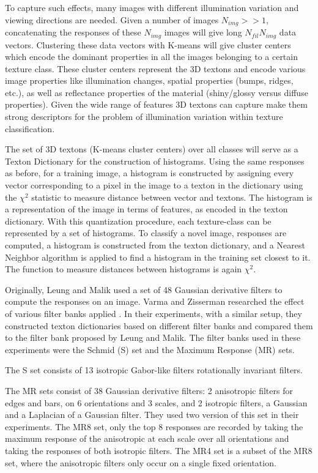 To capture such effects, many images with different illumination variation and viewing directions are needed. Given a number of images $N_{img} >> 1$,  concatenating the responses of these $N_{img}$ images will give long $N_{fil}N_{img}$ data vectors. Clustering these data vectors with K-means will give cluster centers which encode the dominant properties in all the images belonging to a certain texture class. These cluster centers represent the 3D textons and encode various image properties like illumination changes, spatial properties (bumps, ridges, etc.), as well as reflectance properties of the material (shiny/glossy versus diffuse properties). Given the wide range of features 3D textons can capture make them strong descriptors for the problem of illumination variation within texture classification.

The set of 3D textons (K-means cluster centers) over all classes will serve as a Texton Dictionary for the construction of histograms. Using the same responses as before, for a training image, a histogram is constructed by assigning every vector corresponding to a pixel in the image to a texton in the dictionary using the $\chi^2$ statistic to measure distance between vector and textons. The histogram is a representation of the image in terms of features, as encoded in the texton dictionary. With this quantization procedure, each texture-class can be represented by a set of histograms. To classify a novel image, responses are computed, a histogram is constructed from the texton dictionary, and a Nearest Neighbor algorithm is applied to find a histogram in the training set closest to it. The function to measure distances between histograms is again $\chi^2$.

Originally, Leung and Malik used a set of 48 Gaussian derivative filters to compute the responses on an image. Varma and Zisserman researched the effect of various filter banks applied \cite{VarmaZisserman}. In their experiments, with a similar setup, they constructed texton dictionaries based on different filter banks and compared them to the filter bank proposed by Leung and Malik. The filter banks used in these experiments were the Schmid (S) set and the Maximum Response (MR) sets. 

The S set consists of 13 isotropic Gabor-like filters rotationally invariant filters. 

The MR sets consist of 38 Gaussian derivative filters: 2 anisotropic filters for edges and bars, on 6 orientations and 3 scales, and 2 isotropic filters, a Gaussian and a Laplacian of a Gaussian filter. They used two version of this set in their experiments. The MR8 set, only the top 8 responses are recorded by taking the maximum response of the anisotropic at each scale over all orientations and taking the responses of both isotropic filters. The MR4 set is a subset of the MR8 set, where the anisotropic filters only occur on a single fixed orientation. 

